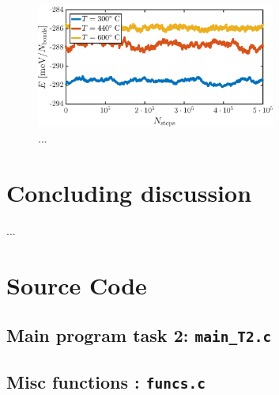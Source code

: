 \begin{figure}[!ht]
\begin{center}
  \includegraphics[width=0.7\textwidth]{../figures/equilibration} 
  \caption{... }
  \label{fig:T2:equil}
\end{center}
\end{figure}

\section*{Concluding discussion}
 ...  
\newpage

\appendix

\section{Source Code}

%

%

\subsection{Main program task 2: \texttt{main\_T2.c}}



\subsection{Misc functions : \texttt{funcs.c}}


